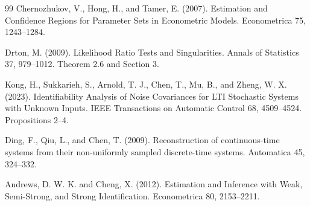 \documentclass{article}
\begin{document}
\begin{thebibliography}{99}
   Chernozhukov, V., Hong, H., and Tamer, E. (2007). Estimation and Confidence Regions for Parameter Sets in Econometric Models. Econometrica 75, 1243--1284.

   Drton, M. (2009). Likelihood Ratio Tests and Singularities. Annals of Statistics 37, 979--1012. Theorem 2.6 and Section 3.

   Kong, H., Sukkarieh, S., Arnold, T. J., Chen, T., Mu, B., and Zheng, W. X. (2023). Identifiability Analysis of Noise Covariances for LTI Stochastic Systems with Unknown Inputs. IEEE Transactions on Automatic Control 68, 4509--4524. Propositions 2--4.

   Ding, F., Qiu, L., and Chen, T. (2009). Reconstruction of continuous-time systems from their non-uniformly sampled discrete-time systems. Automatica 45, 324--332.

   Andrews, D. W. K. and Cheng, X. (2012). Estimation and Inference with Weak, Semi-Strong, and Strong Identification. Econometrica 80, 2153--2211.

\end{thebibliography}
\end{document}

